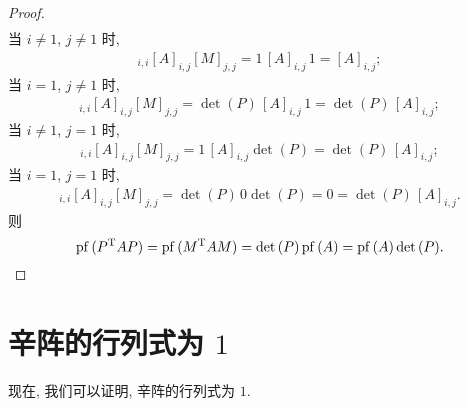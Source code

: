\begin{proof}
\begin{align*}
    \end{align*}
    当 \(i \neq 1\), \(j \neq 1\) 时,
    \begin{align*}
        [M]_{i,i}
        [A]_{i,j}
        [M]_{j,j}
        = 1\, [A]_{i,j}\, 1
            = [A]_{i,j};
    \end{align*}
    当 \(i = 1\), \(j \neq 1\) 时,
    \begin{align*}
        [M]_{i,i}
        [A]_{i,j}
        [M]_{j,j}
        = \det {(P)}\, [A]_{i,j}\, 1
        = \det {(P)}\, [A]_{i,j};
    \end{align*}
    当 \(i \neq 1\), \(j = 1\) 时,
    \begin{align*}
        [M]_{i,i}
        [A]_{i,j}
        [M]_{j,j}
        = 1\, [A]_{i,j} \det {(P)}
        = \det {(P)}\, [A]_{i,j};
    \end{align*}
    当 \(i = 1\), \(j = 1\) 时,
    \begin{align*}
        [M]_{i,i}
        [A]_{i,j}
        [M]_{j,j}
        = \det {(P)}\, 0 \det {(P)}
        = 0
        = \det {(P)}\, [A]_{i,j}.
    \end{align*}
    则
    \begin{equation*}
        \operatorname{pf} {(
            P^{\mathrm{T}} A P
            )}
        =
        \operatorname{pf} {(
            M^{\mathrm{T}} A M
            )}
        =
        \det {(P)} \operatorname{pf} {(A)}
        =
        \operatorname{pf} {(A)} \det {(P)}.
        \qedhere
    \end{equation*}
\end{proof}



\section{\texorpdfstring{辛阵的行列式为 \(1\)}
  {辛阵的行列式为 1}}

现在, 我们可以证明, 辛阵的行列式为 \(1\).

